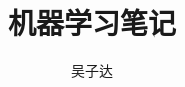 \documentclass[a4paper,12pt]{book}
\begin{document}
\author{吴子达}
\title{机器学习笔记}

\frontmatter
\maketitle
\tableofcontents

\mainmatter



\backmatter
\end{document}
